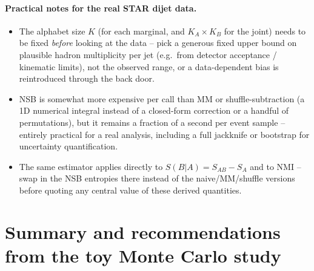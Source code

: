 \documentclass[11pt]{article}
\newcommand{\SBA}{S(B|A)}
\newcommand{\NMI}{\mathrm{NMI}}
\begin{document}
\paragraph{Practical notes for the real STAR dijet data.}
\begin{itemize}
\item The alphabet size $K$ (for each marginal, and $K_A\times K_B$ for
the joint) needs to be fixed \emph{before} looking at the data -- pick a
generous fixed upper bound on plausible hadron multiplicity per jet
(e.g.\ from detector acceptance / kinematic limits), not the observed
range, or a data-dependent bias is reintroduced through the back door.
\item NSB is somewhat more expensive per call than MM or
shuffle-subtraction (a 1D numerical integral instead of a closed-form
correction or a handful of permutations), but it remains a fraction of a
second per event sample -- entirely practical for a real analysis,
including a full jackknife or bootstrap for uncertainty quantification.
\item The same estimator applies directly to $\SBA=S_{AB}-S_A$ and to
$\NMI$ -- swap in the NSB entropies there instead of the
naive/MM/shuffle versions before quoting any central value of these
derived quantities.
\end{itemize}

\section{Summary and recommendations from the toy Monte Carlo study}
\end{document}
